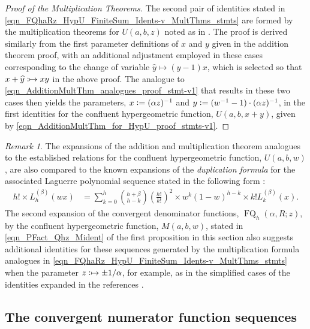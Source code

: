 \documentclass[12pt,reqno]{article}
\numberwithin{sfootnote}{section}
\numberwithin{equation}{section}
\theoremstyle{plain}
\theoremstyle{definition}
\theoremstyle{remark}
\newtheorem{remark}[theorem]{Remark}
\newcommand{\cf}[0]{cf.\ }
\newcommand{\defequals}{\ensuremath{\vcentcolon=}}
\newcommand{\defmapsto}{\ensuremath{\vcentcolon\mapsto}}
\newcommand{\HypU}[3]{\ensuremath{U\left(#1, #2, #3\right)}}
\newcommand{\HypM}[3]{\ensuremath{M\left(#1, #2, #3\right)}}
\newcommand{\ConvFQ}[4]{\ensuremath{\FQ_{#1}\left(#2, #3; #4\right)}}
\DeclareMathOperator{\FQ}{FQ}
\begin{document}
\begin{proof}[Proof of the Multiplication Theorems] 
The second pair of identities stated in 
\eqref{eqn_FQhaRz_HypU_FiniteSum_Idents-v_MultThms_stmts} 
are formed by the 
multiplication theorems for $\HypU{a}{b}{z}$ noted as in 
\citep[\S 13.13(iii)]{NISTHB}. 
The proof is derived similarly from the first parameter 
definitions of $x$ and $y$ given in the addition theorem proof, 
with an additional adjustment employed in these cases 
corresponding to the change of variable 
$\widehat{y} \mapsto (y-1) x$, which is selected so that 
$x + \widehat{y} \defmapsto xy$ in the above proof. 
The analogue to 
\eqref{eqn_AdditionMultThm_analogues_proof_stmt-v1} 
that results in these two cases then 
yields the parameters, 
$x \defequals (\alpha z)^{-1}$ and $y \defequals (w^{-1}-1) \cdot (\alpha z)^{-1}$, 
in the first identities for the 
confluent hypergeometric function, $\HypU{a}{b}{x+y}$, 
given by \eqref{eqn_AdditionMultThm_for_HypU_proof_stmts-v1}. 
\end{proof} 

\begin{remark} 
The expansions of the addition and multiplication theorem analogues to the 
established relations for the confluent hypergeometric function, 
$\HypU{a}{b}{w}$, are also compared to the known expansions of the 
\emph{duplication formula} for the associated Laguerre polynomial 
sequence stated in the following form 
\citep[\S 5.1]{UC} \citep[\cf \S 18.18(iii)]{NISTHB}: 
\begin{align*} 
h! \times L_h^{(\beta)}(wx) & = 
     \sum_{k=0}^{h} \binom{h+\beta}{h-k} \left(\frac{h!}{k!}\right)^{2} 
     \times w^{k} (1-w)^{h-k} \times k! L_k^{(\beta)}(x). 
\end{align*} 
The second expansion of the convergent denominator functions, 
$\ConvFQ{h}{\alpha}{R}{z}$, by the 
confluent hypergeometric function, $\HypM{a}{b}{w}$, stated in 
\eqref{eqn_PFact_Qhz_Mident} of the first proposition in this section 
also suggests additional identities for these sequences generated by the 
multiplication formula analogues in 
\eqref{eqn_FQhaRz_HypU_FiniteSum_Idents-v_MultThms_stmts} 
when the parameter $z \defmapsto \pm 1 / \alpha$, for example, as in the 
simplified cases of the identities expanded in the references 
\citep[\S 5.5 -- \S 5.6; Ex.\ 5.29]{GKP} 
\citep[\cf \S 15]{NISTHB}. 
\end{remark} 

\subsection{The convergent numerator function sequences} 
\label{subsubSection_Properties_Of_ConvFn_Phz} 
\end{document}
